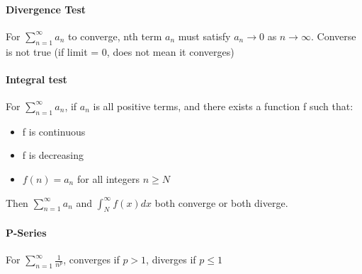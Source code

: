 \documentclass[10pt,landscape]{article}
\begin{document}
\begin{multicols}{4}
\paragraph{Divergence Test}
For $\sum_{n=1}^{\infty}a_n$ to converge, nth term $a_n$ must satisfy $a_n \rightarrow 0$ as $n \rightarrow \infty$. Converse is not true (if limit = 0, does not mean it converges)

\paragraph{Integral test}
For $\sum_{n=1}^{\infty}a_n$, if $a_n$ is all positive terms, and there exists a function f such that:

\begin{itemize}
	\item f is continuous
	\item f is decreasing
	\item $f(n) = a_n$ for all integers $n \geq N$
\end{itemize}

Then $\sum_{n=1}^{\infty}a_n$ and $\int_{N}^{\infty}f(x)dx$ both converge or both diverge.

\paragraph{P-Series}
For $\sum_{n=1}^{\infty} \frac{1}{n^p}$, converges if $p > 1$, diverges if $p \leq 1$

		
	\end{multicols}
\end{document}
